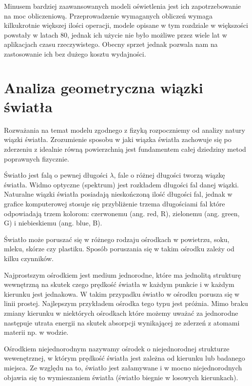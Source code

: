 \documentclass[../main.tex]{subfiles}
\begin{document}
Minusem bardziej zaawansowanych modeli oświetlenia jest ich zapotrzebowanie na
moc obliczeniową. Przeprowadzenie wymaganych obliczeń wymaga kilkukrotnie
większej ilości operacji, modele opisane w tym rozdziale w większości powstały
w latach 80, jednak ich użycie nie było możliwe przez wiele lat w aplikacjach
czasu rzeczywistego. Obecny sprzet jednak pozwala nam na zastosowanie ich bez
dużego kosztu wydajności.

\section{Analiza geometryczna wiązki światła}

Rozważania na temat modelu zgodnego z fizyką rozpoczniemy od analizy natury
wiązki światła. Zrozumienie sposobu w jaki wiązka światła zachowuje się po
zderzeniu z idealnie równą powierzchnią jest fundamentem całej dziedziny metod
poprawnych fizycznie.

Światło jest falą o pewnej długości $\lambda$, fale o różnej długości tworzą
wiązkę światła. Widmo optyczne (spektrum) jest rozkładem długości fal danej
wiązki. Naturalne wiązki światła posiadają nieskończoną ilość długości fal,
jednak w grafice komputerowej stosuje się przybliżenie trzema długościami fal
które odpowiadają trzem kolorom: czerwonemu (ang. red, R), zielonemu (ang.
green, G) i niebieskiemu (ang. blue, B).

\begin{figure}[ht]
\end{figure}

Światło może poruszać się w różnego rodzaju ośrodkach w powietrzu, soku, mleku,
skórze czy plastiku. Sposób poruszania się w takim ośrodku zależy od kilku
czynników.

Najprostszym ośrodkiem jest medium jednorodne, które ma jednolitą strukturę
wewnętrzną na skutek czego prędkość światła w każdym punkcie i w każdym
kierunku jest jednakowa. W takim przypadku światło w ośrodku porusza się w
linii prostej. Najlepszym przykładem ośrodka tego typu jest próżnia. Mimo braku
zmiany kierunku w niektórych ośrodkach które możemy uważać za jednorodne
następuje utrata energii na skutek absorpcji wynikającej ze zderzeń z atomami
materii np. w wodzie.

Ośrodkiem niejednorodnym nazywamy ośrodek o niejednorodnej strukturze
wewenętrznej, w którym prędkość światła jest zależna od kierunku lub badanego
miejsca. Ze względu na to, światło jest załamywane i w mocno niejednorodnych
objawia się to  wymieszaniem światła (światło biegnie w losowych kierunkach).
\end{document}
